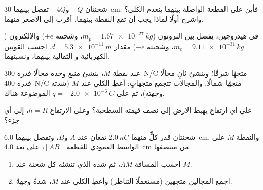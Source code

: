 \begin{exercise}[$\star\star$]\label{exo:g11:electric-gravitational-fields:9}
شحنتان $+Q$ و$+4Q$ تفصل بينهما \qty{30}{cm}. فأين على القطعة
الواصلة بينهما ينعدم  الكلي؟ واشرح أولًا لماذا يجب أن تقع النقطة
بينهما، أقرب إلى الأصغر منهما.
\end{exercise}

\begin{exercise}[$\star\star$]\label{exo:g11:electric-gravitational-fields:10}
في  هيدروجين، يفصل بين البروتون ($m_p = \qty{1.67e-27}{kg}$، وشحنته
$+e$) والإلكترون ($m_e = \qty{9.11e-31}{kg}$، وشحنته $-e$)
مقدار $d = \qty{5.3e-11}{m}$. احسب القوتين الكهربائية و
الثقالية بينهما، ونسبتهما.
\end{exercise}

\begin{exercise}[$\star\star$]\label{exo:g11:electric-gravitational-fields:11}
عند نقطة $M$، ينشئ منبع وحده مجالًا قدره \qty{300}{N/C}
متجهًا شرقًا؛ وينشئ ثانٍ مجالًا قدره \qty{400}{N/C} متجهًا شمالًا. والمجالات تتجمع
متجهاتٍ: أعطِ  الكلي عند $M$ (شدته وجهته)، ثم
 على $q = \qty{-2.0e-6}{C}$ الموضوعة هناك.
\end{exercise}

\begin{exercise}[$\star\star\star$]\label{exo:g11:electric-gravitational-fields:12}
على أي ارتفاع يهبط  الأرض إلى نصف قيمته
السطحية؟ وعلى الارتفاع $h = R$، إلى أي جزء؟
\end{exercise}

\begin{exercise}[$\star\star\star$]\label{exo:g11:electric-gravitational-fields:13}
شحنتان قدر كلٍّ منهما $\qty{+2.0}{nC}$ تقعان عند $A$ و$B$، وتفصل بينهما \qty{6.0}{cm}.
والنقطة $M$ على الواسط العمودي للقطعة $[AB]$، على بعد \qty{4.0}{cm} من
منتصفها.
\begin{enumerate}
  \item احسب المسافة $AM$، ثم شدة  الذي تنشئه كل
        شحنة عند $M$.
  \item اجمع المجالين متجهين (مستعملًا التناظر) وأعطِ
         الكلي عند $M$، شدةً وجهةً.
\end{enumerate}
\end{exercise}


